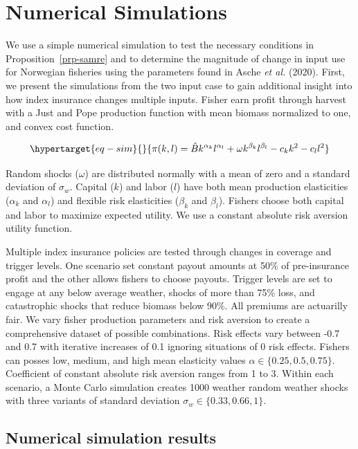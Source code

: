 \documentclass[
  letterpaper,
  DIV=11,
  numbers=noendperiod]{scrartcl}
\theoremstyle{plain}
\theoremstyle{plain}
\theoremstyle{remark}
\begin{document}
\hypertarget{sec-sim}{%
\section{Numerical Simulations}\label{sec-sim}}

We use a simple numerical simulation to test the necessary conditions in
Proposition~\ref{prp-samre} and to determine the magnitude of change in
input use for Norwegian fisheries using the parameters found in Asche
\emph{et al.} (2020). First, we present the simulations from the two
input case to gain additional insight into how index insurance changes
multiple inputs. Fisher earn profit through harvest with a Just and Pope
production function with mean biomass normalized to one, and convex cost
function.

\begin{equation}\protect\hypertarget{eq-sim}{}{
\pi(k,l)=\hat{B}k^{\alpha_k}l^{\alpha_l}+\omega k^{\beta_k}l^{\beta_l}-c_kk^2-c_ll^2
}\label{eq-sim}\end{equation}

Random shocks (\(\omega\)) are distributed normally with a mean of zero
and a standard deviation of \(\sigma_w\). Capital (\(k\)) and labor
(\(l\)) have both mean production elasticities (\(\alpha_k\) and
\(\alpha_l\)) and flexible risk elasticities (\(\beta_k\) and
\(\beta_l\)). Fishers choose both capital and labor to maximize expected
utility. We use a constant absolute risk aversion utility function.

Multiple index insurance policies are tested through changes in coverage
and trigger levels. One scenario set constant payout amounts at 50\% of
pre-insurance profit and the other allows fishers to choose payouts.
Trigger levels are set to engage at any below average weather, shocks of
more than 75\% loss, and catastrophic shocks that reduce biomass below
90\%. All premiums are actuarilly fair. We vary fisher production
parameters and risk aversion to create a comprehensive dataset of
possible combinations. Risk effects vary between -0.7 and 0.7 with
iterative increases of 0.1 ignoring situations of 0 risk effects.
Fishers can posses low, medium, and high mean elasticity values
\(\alpha\in\{0.25,0.5,0.75\}\). Coefficient of constant absolute risk
aversion ranges from 1 to 3. Within each scenario, a Monte Carlo
simulation creates 1000 weather random weather shocks with three
variants of standard deviation \(\sigma_w\in\{0.33,0.66,1\}\).

\hypertarget{numerical-simulation-results}{%
\subsection{Numerical simulation
results}\label{numerical-simulation-results}}
\end{document}
